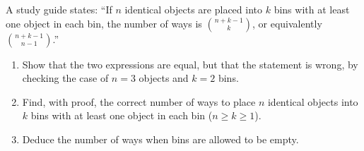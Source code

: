A study guide states: ``If $n$ identical objects are placed into $k$ bins with at least one object in each bin, the number of ways is $\binom{n+k-1}{k}$, or equivalently $\binom{n+k-1}{n-1}$.''
\begin{enumerate}
\item[(a)] Show that the two expressions are equal, but that the statement is wrong, by checking the case of $n=3$ objects and $k=2$ bins.
\item[(b)] Find, with proof, the correct number of ways to place $n$ identical objects into $k$ bins with at least one object in each bin ($n\ge k\ge1$).
\item[(c)] Deduce the number of ways when bins are allowed to be empty.
\end{enumerate}
